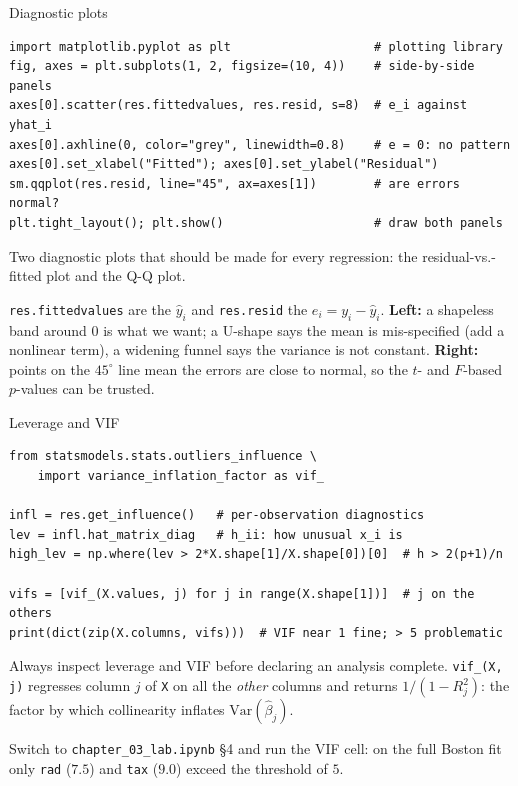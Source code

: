 \documentclass[aspectratio=169,11pt]{beamer}
\begin{document}
\begin{frame}[fragile]{Diagnostic plots}
  \begin{lstlisting}
import matplotlib.pyplot as plt                    # plotting library
fig, axes = plt.subplots(1, 2, figsize=(10, 4))    # side-by-side panels
axes[0].scatter(res.fittedvalues, res.resid, s=8)  # e_i against yhat_i
axes[0].axhline(0, color="grey", linewidth=0.8)    # e = 0: no pattern
axes[0].set_xlabel("Fitted"); axes[0].set_ylabel("Residual")
sm.qqplot(res.resid, line="45", ax=axes[1])        # are errors normal?
plt.tight_layout(); plt.show()                     # draw both panels
  \end{lstlisting}
  Two diagnostic plots that should be made for every regression: the
  residual-vs.-fitted plot and the Q-Q plot.
  \begin{readme}\footnotesize
    \texttt{res.fittedvalues} are the $\hat y_i$ and \texttt{res.resid}
    the $e_i=y_i-\hat y_i$. \textbf{Left:} a shapeless band around $0$ is
    what we want; a U-shape says the mean is mis-specified (add a
    nonlinear term), a widening funnel says the variance is not constant.
    \textbf{Right:} points on the $45^\circ$ line mean the errors are
    close to normal, so the $t$- and $F$-based $p$-values can be trusted.
  \end{readme}
\end{frame}

\begin{frame}[fragile]{Leverage and VIF}
  \begin{lstlisting}
from statsmodels.stats.outliers_influence \
    import variance_inflation_factor as vif_

infl = res.get_influence()   # per-observation diagnostics
lev = infl.hat_matrix_diag   # h_ii: how unusual x_i is
high_lev = np.where(lev > 2*X.shape[1]/X.shape[0])[0]  # h > 2(p+1)/n

vifs = [vif_(X.values, j) for j in range(X.shape[1])]  # j on the others
print(dict(zip(X.columns, vifs)))  # VIF near 1 fine; > 5 problematic
  \end{lstlisting}
  Always inspect leverage and VIF before declaring an analysis
  complete. \texttt{vif\_(X, j)} regresses column $j$ of \texttt{X} on
  all the \emph{other} columns and returns $1/(1-R_j^2)$: the factor by
  which collinearity inflates $\mathrm{Var}(\hat\beta_j)$.
  \begin{labnote}
    Switch to \texttt{chapter\_03\_lab.ipynb} \S4 and run the VIF cell: on
    the full Boston fit only \texttt{rad} ($7.5$) and \texttt{tax} ($9.0$)
    exceed the threshold of $5$.
  \end{labnote}
\end{frame}
\end{document}
